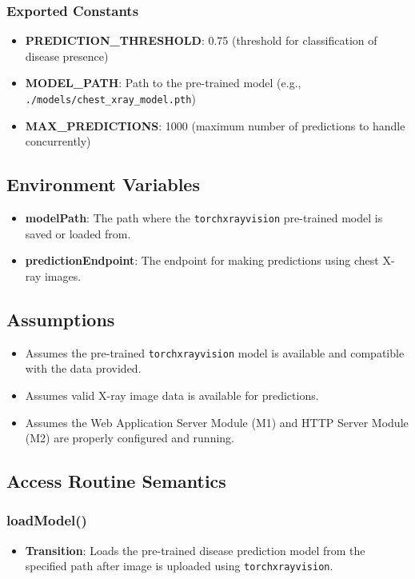 \documentclass[12pt, titlepage]{article}
\begin{document}
\subsubsection{Exported Constants}
\begin{itemize}
    \item \textbf{PREDICTION\_THRESHOLD}: 0.75 (threshold for classification of disease presence)
    \item \textbf{MODEL\_PATH}: Path to the pre-trained model (e.g., \texttt{./models/chest\_xray\_model.pth})
    \item \textbf{MAX\_PREDICTIONS}: 1000 (maximum number of predictions to handle concurrently)
\end{itemize}

\subsection{Environment Variables}
\begin{itemize}
    \item \textbf{modelPath}: The path where the \texttt{torchxrayvision} pre-trained model is saved or loaded from.
    \item \textbf{predictionEndpoint}: The endpoint for making predictions using chest X-ray images.
\end{itemize}

\subsection{Assumptions}
\begin{itemize}
    \item Assumes the pre-trained \texttt{torchxrayvision} model is available and compatible with the data provided.
    \item Assumes valid X-ray image data is available for predictions.
    \item Assumes the Web Application Server Module (M1) and HTTP Server Module (M2) are properly configured and running.
\end{itemize}

\subsection{Access Routine Semantics}
\subsubsection{loadModel()}
\begin{itemize}
    \item \textbf{Transition}: Loads the pre-trained disease prediction model from the specified path after image is uploaded using \texttt{torchxrayvision}.
\end{itemize}
\end{document}
